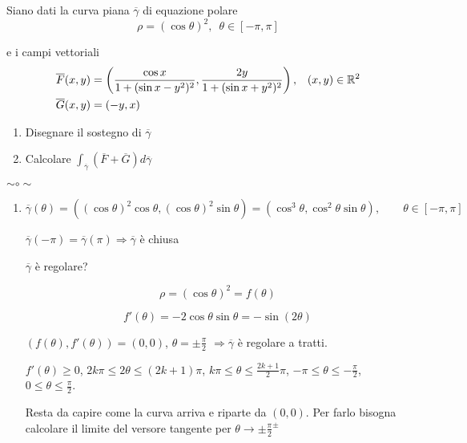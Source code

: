 \begin{exbar}
\begin{example}
	Siano dati la curva piana $\overline{\gamma}$ di equazione polare
	\begin{equation*}
		\rho = (\cos \theta)^2,\,\,\, \theta \in[-\pi,\pi] 
	\end{equation*}
	
	e i campi vettoriali
	\begin{align*}
		\overline{F}(x,y)&=\left( \frac{\cos x}{1+(\sin x-y^2)^2},\frac{2y}{1+(\sin x + y^2)^2} \right),\,\,\,\,\,(x,y) \in \mathbb{R}^2 \\
		\overline{G}(x,y)&= (-y,x)
	\end{align*}
	\begin{enumerate}
		\item Disegnare il sostegno di $\overline{\gamma}$
		\item Calcolare $\int_{\overline{\gamma}}(\overline{F}+\overline{G})d\overline{\gamma}$
	\end{enumerate}
	
	{\centering $\sim \circ \sim$ \par}
	
	\begin{enumerate}
		\item $$\overline{\gamma}(\theta)=((\cos \theta)^2\cos \theta, (\cos \theta)^2 \sin \theta)=(\cos^3 \theta, \cos ^2 \theta \sin \theta), \qquad \theta \in [-\pi,\pi]$$
		
		$\overline{\gamma}(-\pi)=\overline{\gamma}(\pi)\Rightarrow \overline{\gamma}$ è chiusa
		
		$\overline{\gamma}$ è regolare?
		
		$$\rho=(\cos \theta )^2=f(\theta)$$
		
		$$f'(\theta)=-2\cos \theta \sin \theta=-\sin(2\theta)$$
		
		$(f(\theta), f'(\theta))=(0,0)$, $\theta = \pm\frac{\pi}{2}$ $\Rightarrow \overline{\gamma} $ è regolare a tratti.
		
		$f'(\theta) \geq 0$, $2k\pi \leq 2\theta \leq (2k+1)\pi$, $k\pi \leq \theta \leq \frac{2k+1}{2}\pi$, $-\pi \leq \theta \leq -\frac{\pi}{2}$, $0 \leq \theta \leq \frac{\pi}{2}$.


		Resta da capire come la curva arriva e riparte da $(0,0)$. Per farlo bisogna calcolare il limite del versore tangente per $\theta \rightarrow \pm \frac{\pi}{2}^{\pm}$
		

\end{enumerate}
\end{example}
\end{exbar}
